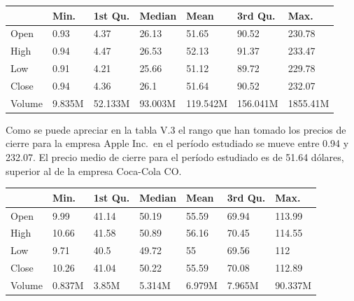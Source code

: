 \documentclass[]{DissertateUSU}
\begin{document}
\begin{table}[H]
\centering\begingroup\fontsize{10}{12}\selectfont

\begin{tabular}{l|l|l|l|l|l|l}
\hline
  & Min. & 1st Qu. & Median & Mean & 3rd Qu. & Max.\\
\hline
Open & 0.93 & 4.37 & 26.13 & 51.65 & 90.52 & 230.78\\
\hline
High & 0.94 & 4.47 & 26.53 & 52.13 & 91.37 & 233.47\\
\hline
Low & 0.91 & 4.21 & 25.66 & 51.12 & 89.72 & 229.78\\
\hline
Close & 0.94 & 4.36 & 26.1 & 51.64 & 90.52 & 232.07\\
\hline
Volume & 9.835M & 52.133M & 93.003M & 119.542M & 156.041M & 1855.41M\\
\hline
\end{tabular}
\endgroup{}
\end{table}

\setlength\parskip{5ex}
\justifying

\noindent Como se puede apreciar en la tabla V.3 el rango que han tomado
los precios de cierre para la empresa Apple Inc.~en el período estudiado
se mueve entre 0.94 y 232.07. El precio medio de cierre para el período
estudiado es de 51.64 dólares, superior al de la empresa Coca-Cola CO.

\begin{table}[H]
\centering\begingroup\fontsize{10}{12}\selectfont

\begin{tabular}{l|l|l|l|l|l|l}
\hline
  & Min. & 1st Qu. & Median & Mean & 3rd Qu. & Max.\\
\hline
Open & 9.99 & 41.14 & 50.19 & 55.59 & 69.94 & 113.99\\
\hline
High & 10.66 & 41.58 & 50.89 & 56.16 & 70.45 & 114.55\\
\hline
Low & 9.71 & 40.5 & 49.72 & 55 & 69.56 & 112\\
\hline
Close & 10.26 & 41.04 & 50.22 & 55.59 & 70.08 & 112.89\\
\hline
Volume & 0.837M & 3.85M & 5.314M & 6.979M & 7.965M & 90.337M\\
\hline
\end{tabular}
\endgroup{}
\end{table}

\setlength\parskip{5ex}
\justifying
\end{document}
